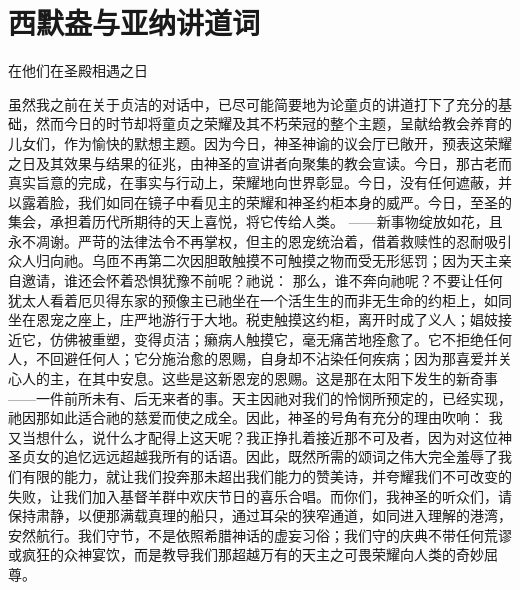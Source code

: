 
\chapter{西默盎与亚纳讲道词}


在他们在圣殿相遇之日\par

虽然我之前在关于贞洁的对话中，已尽可能简要地为论童贞的讲道打下了充分的基础，然而今日的时节却将童贞之荣耀及其不朽荣冠的整个主题，呈献给教会养育的儿女们，作为愉快的默想主题。因为今日，神圣神谕的议会厅已敞开，预表这荣耀之日及其效果与结果的征兆，由神圣的宣讲者向聚集的教会宣读。今日，那古老而真实旨意的完成，在事实与行动上，荣耀地向世界彰显。今日，没有任何遮蔽，并以露着脸，我们如同在镜子中看见主的荣耀和神圣约柜本身的威严。今日，至圣的集会，承担着历代所期待的天上喜悦，将它传给人类。 ——新事物绽放如花，且永不凋谢。严苛的法律法令不再掌权，但主的恩宠统治着，借着救赎性的忍耐吸引众人归向祂。乌匝不再第二次因胆敢触摸不可触摸之物而受无形惩罚；因为天主亲自邀请，谁还会怀着恐惧犹豫不前呢？祂说： 那么，谁不奔向祂呢？不要让任何犹太人看着厄贝得东家的预像主已祂坐在一个活生生的而非无生命的约柜上，如同坐在恩宠之座上，庄严地游行于大地。税吏触摸这约柜，离开时成了义人；娼妓接近它，仿佛被重塑，变得贞洁；癞病人触摸它，毫无痛苦地痊愈了。它不拒绝任何人，不回避任何人；它分施治愈的恩赐，自身却不沾染任何疾病；因为那喜爱并关心人的主，在其中安息。这些是这新恩宠的恩赐。这是那在太阳下发生的新奇事——一件前所未有、后无来者的事。天主因祂对我们的怜悯所预定的，已经实现，祂因那如此适合祂的慈爱而使之成全。因此，神圣的号角有充分的理由吹响： 我又当想什么，说什么才配得上这天呢？我正挣扎着接近那不可及者，因为对这位神圣贞女的追忆远远超越我所有的话语。因此，既然所需的颂词之伟大完全羞辱了我们有限的能力，就让我们投奔那未超出我们能力的赞美诗，并夸耀我们不可改变的失败，让我们加入基督羊群中欢庆节日的喜乐合唱。而你们，我神圣的听众们，请保持肃静，以便那满载真理的船只，通过耳朵的狭窄通道，如同进入理解的港湾，安然航行。我们守节，不是依照希腊神话的虚妄习俗；我们守的庆典不带任何荒谬或疯狂的众神宴饮，而是教导我们那超越万有的天主之可畏荣耀向人类的奇妙屈尊。\par

